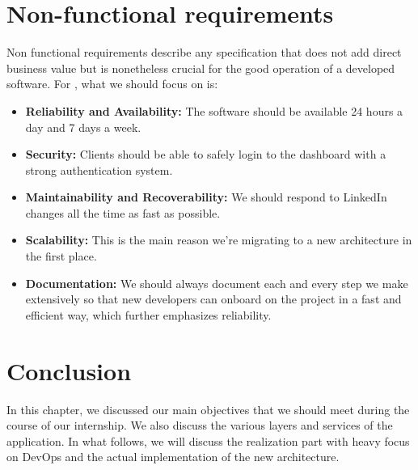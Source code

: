 \section{Non-functional requirements}
Non functional requirements describe any specification that does not add direct business value but is nonetheless crucial for the good operation of a developed software.
For , what we should focus on is:
\begin{itemize}
	\item \textbf{Reliability and Availability:} The software should be available 24 hours a day and 7 days a week.
	\item \textbf{Security:} Clients should be able to safely login to the dashboard with a strong authentication system.
	\item \textbf{Maintainability and Recoverability:} We should respond to LinkedIn changes all the time as fast as possible.
	\item \textbf{Scalability:} This is the main reason we're migrating to a new architecture in the first place.
	\item \textbf{Documentation:} We should always document each and every step we make extensively so that new developers can onboard on the project in a fast and efficient way, which further emphasizes reliability.
\end{itemize}

\setcounter{secnumdepth}{0} %
\section{Conclusion}
In this chapter, we discussed our main objectives that we should meet during the course of our internship.
We also discuss the various layers and services of the application.
In what follows, we will discuss the realization part with heavy focus on DevOps and the actual implementation of the new architecture.

